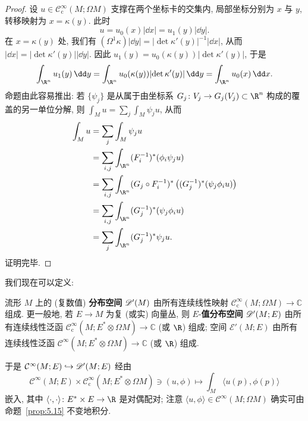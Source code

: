 \begin{proof}
设 $u \in \mathcal{C}_{\mathrm{c}}^\infty(M; \Omega M)$ 支撑在两个坐标卡的交集内, 局部坐标分别为 $x$ 与 $y$, 转移映射为 $x = \kappa(y)$. 此时
\begin{equation}\label{eq:5.40}
    u = u_0(x) |\dd x| = u_1(y) |\dd y|.
\end{equation}
在 $x = \kappa(y)$ 处, 我们有 $(\Omega^1 \kappa) |\dd y| = |\!\det \kappa'(y)|^{-1} |\dd x|$, 从而 $|\dd x| = |\!\det \kappa'(y)| |\dd y|$. 因此 $u_1(y) = u_0(\kappa(y)) |\!\det \kappa'(y)|$, 于是
\begin{equation}\label{eq:5.41}
    \int_{\R^n} u_1(y) \,\dd y = \int_{\R^n} u_0(\kappa(y)) |\!\det \kappa'(y)| \,\dd y = \int_{\R^n} u_0(x) \,\dd x.
\end{equation}
命题由此容易推出: 若 $\{\psi_j\}$ 是从属于由坐标系 $G_j \colon V_j \to G_j(V_j) \subset \R^n$ 构成的覆盖的另一单位分解, 则 $\int_M u = \sum_j \int_M \psi_j u$, 从而
\[
    \begin{aligned}
        \int_M u &= \sum_j \int_M \psi_j u \\
        &= \sum_{i, j} \int_{\R^n} (F_i^{-1})^*(\phi_i \psi_j u) \\
        &= \sum_{i, j} \int_{\R^n} (G_j \circ F_i^{-1})^*\left( (G_j^{-1})^*(\psi_j \phi_i u) \right) \\
        &= \sum_{i, j} \int_{\R^n} (G_j^{-1})^*(\psi_j \phi_i u) \\
        &= \sum_j \int_{\R^n} (G_j^{-1})^* \psi_j u.
    \end{aligned}
\]
证明完毕.
\end{proof}

我们现在可以定义:

\begin{definition}[流形上的分布空间]\label{def:5.16}
流形 $M$ 上的 (复数值) \textbf{分布空间} $\mathscr{D}'(M)$ 由所有连续线性映射 $\mathcal{C}_{\mathrm{c}}^\infty(M; \Omega M) \to \mathbb{C}$ 组成. 更一般地, 若 $E \to M$ 为复 (或实) 向量丛, 则 $E$-\textbf{值分布空间} $\mathscr{D}'(M; E)$ 由所有连续线性泛函 $\mathcal{C}_{\mathrm{c}}^\infty(M; E^* \otimes \Omega M) \to \mathbb{C}$ (或 $\R$) 组成; 空间 $\mathscr{E}'(M; E)$ 由所有连续线性泛函 $\mathcal{C}^\infty(M; E^* \otimes \Omega M) \to \mathbb{C}$ (或 $\R$) 组成.

于是 $\mathcal{C}^\infty(M; E) \hookrightarrow \mathscr{D}'(M; E)$ 经由
\begin{equation}\label{eq:5.42}
    \mathcal{C}^\infty(M; E) \times \mathcal{C}_{\mathrm{c}}^\infty(M; E^* \otimes \Omega M) \ni (u, \phi) \mapsto \int_M \langle u(p), \phi(p) \rangle
\end{equation}
嵌入, 其中 $\langle \cdot, \cdot \rangle \colon E^* \times E \to \R$ 是对偶配对; 注意 $\langle u, \phi \rangle \in \mathcal{C}^\infty(M; \Omega M)$ 确实可由命题~\ref{prop:5.15} 不变地积分.
\end{definition}


